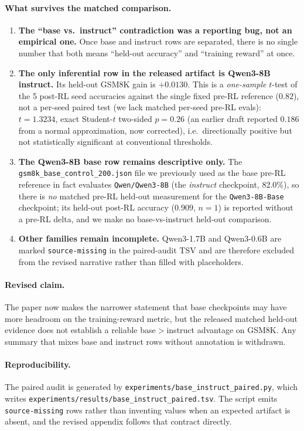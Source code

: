 \paragraph{What survives the matched comparison.}
\begin{enumerate}
  \item \textbf{The ``base vs.\ instruct'' contradiction was a reporting bug,
        not an empirical one.} Once base and instruct rows are separated,
        there is no single number that both means ``held-out accuracy'' and
        ``training reward'' at once.
  \item \textbf{The only inferential row in the released artifact is
        Qwen3-8B instruct.} Its held-out GSM8K gain is
        $+0.0130$. This is a \emph{one-sample} $t$-test of the 5 post-RL seed
        accuracies against the single fixed pre-RL reference ($0.82$), not a
        per-seed paired test (we lack matched per-seed pre-RL evals): $t=1.3234$,
        exact Student-$t$ two-sided $p=0.26$ (an earlier draft reported $0.186$
        from a normal approximation, now corrected), i.e.\
        directionally positive but not statistically significant at conventional
        thresholds.
  \item \textbf{The Qwen3-8B base row remains descriptive only.} The
        \texttt{gsm8k\_base\_control\_200.json} file we previously used as the
        base pre-RL reference in fact evaluates \texttt{Qwen/Qwen3-8B} (the
        \emph{instruct} checkpoint, 82.0\%), so there is \emph{no} matched
        pre-RL held-out measurement for the \texttt{Qwen3-8B-Base} checkpoint;
        its held-out post-RL accuracy ($0.909$, $n=1$) is reported without a
        pre-RL delta, and we make no base-vs-instruct held-out comparison.
  \item \textbf{Other families remain incomplete.} Qwen3-1.7B and Qwen3-0.6B
        are marked \texttt{source-missing} in the paired-audit TSV and are
        therefore excluded from the revised narrative rather than filled with
        placeholders.
\end{enumerate}

\paragraph{Revised claim.}
The paper now makes the narrower statement that base checkpoints may have
more headroom on the training-reward metric, but the released matched
held-out evidence does not establish a reliable base$>$instruct advantage on
GSM8K. Any summary that mixes base and instruct rows without annotation is
withdrawn.

\paragraph{Reproducibility.}
The paired audit is generated by
\texttt{experiments/base\_instruct\_paired.py}, which writes
\texttt{experiments/results/base\_instruct\_paired.tsv}. The script emits
\texttt{source-missing} rows rather than inventing values when an expected
artifact is absent, and the revised appendix follows that contract directly.
